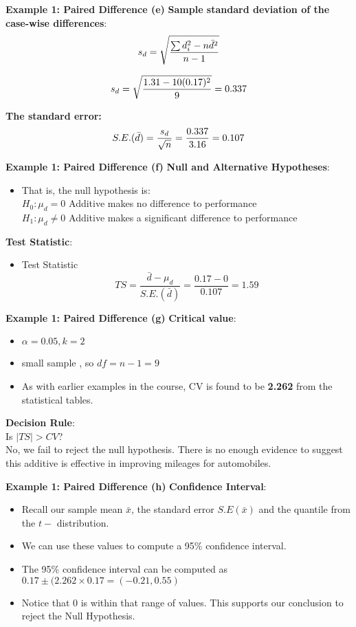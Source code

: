 \documentclass[a4]{beamer}
\begin{document}
\noindent \textbf{Example 1: Paired Difference (e)}
\textbf{Sample standard deviation  of the case-wise differences}:
\[s_d = \sqrt{ {\sum d_i^2 - n\bar{d}^2 \over n-1}}\]

\[s_d = \sqrt{ { 1.31 - 10(0.17)^2 \over 9}} = 0.337\]

\textbf{The standard error:} \[ S.E.(\bar{d}) = \frac{s_d }{\sqrt{n}} = {0.337 \over 3.16} = 0.107\]



\noindent \textbf{Example 1: Paired Difference (f)}
\textbf{Null and Alternative Hypotheses}:
\begin{itemize}
\item That is, the null hypothesis is:\\
$H_0: \mu_d = 0$ Additive makes no difference to performance\\
$H_1: \mu_d \neq 0$ Additive makes a significant difference to performance \\
\end{itemize}
\vspace{0.5cm}
\textbf{Test Statistic}:
\begin{itemize}
\item Test Statistic
\[TS =\frac{\bar{d} - \mu_d}{S.E.(\bar{d})} =  \frac{0.17 - 0}{0.107} = 1.59\]
\end{itemize}



\noindent \textbf{Example 1: Paired Difference (g)}
\textbf{Critical value}:
\begin{itemize}
\item $\alpha = 0.05, k = 2$ \item small sample , so $df = n-1 = 9$
\item As with earlier examples in the course, CV is found to be \textbf{2.262} from the statistical tables.
\end{itemize}
\bigskip
\textbf{Decision Rule}:\\
Is $|TS| > CV$? \\ No, we fail to reject the null hypothesis.
There is no enough evidence to suggest this additive is effective in improving mileages for automobiles.



\noindent \textbf{Example 1: Paired Difference (h)}
\textbf{Confidence Interval}:
\begin{itemize}
\item Recall our sample mean $\bar{x}$, the standard error $S.E(\bar{x})$ and the quantile from the $t-$ distribution.
\item We can use these values to compute a 95\% confidence interval.
\item The 95\% confidence interval can be computed as $0.17 \pm (2.262 \times 0.17 = (-0.21,0.55)$
\item Notice that 0 is within that range of values. This supports our conclusion to reject the Null Hypothesis.
\end{itemize}
\end{document}
